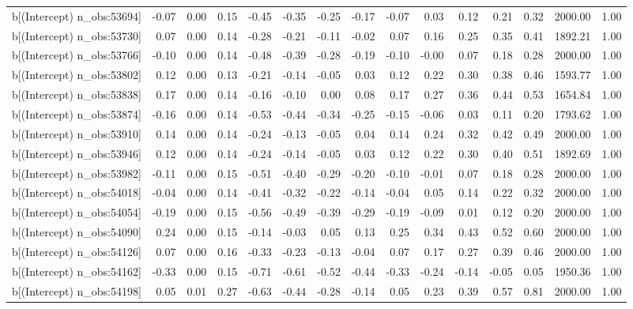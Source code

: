 \begin{table}[ht]
\begin{tabular}{rrrrrrrrrrrrrrr}
  b[(Intercept) n\_obs:53694] & -0.07 & 0.00 & 0.15 & -0.45 & -0.35 & -0.25 & -0.17 & -0.07 & 0.03 & 0.12 & 0.21 & 0.32 & 2000.00 & 1.00 \\ 
  b[(Intercept) n\_obs:53730] & 0.07 & 0.00 & 0.14 & -0.28 & -0.21 & -0.11 & -0.02 & 0.07 & 0.16 & 0.25 & 0.35 & 0.41 & 1892.21 & 1.00 \\ 
  b[(Intercept) n\_obs:53766] & -0.10 & 0.00 & 0.14 & -0.48 & -0.39 & -0.28 & -0.19 & -0.10 & -0.00 & 0.07 & 0.18 & 0.28 & 2000.00 & 1.00 \\ 
  b[(Intercept) n\_obs:53802] & 0.12 & 0.00 & 0.13 & -0.21 & -0.14 & -0.05 & 0.03 & 0.12 & 0.22 & 0.30 & 0.38 & 0.46 & 1593.77 & 1.00 \\ 
  b[(Intercept) n\_obs:53838] & 0.17 & 0.00 & 0.14 & -0.16 & -0.10 & 0.00 & 0.08 & 0.17 & 0.27 & 0.36 & 0.44 & 0.53 & 1654.84 & 1.00 \\ 
  b[(Intercept) n\_obs:53874] & -0.16 & 0.00 & 0.14 & -0.53 & -0.44 & -0.34 & -0.25 & -0.15 & -0.06 & 0.03 & 0.11 & 0.20 & 1793.62 & 1.00 \\ 
  b[(Intercept) n\_obs:53910] & 0.14 & 0.00 & 0.14 & -0.24 & -0.13 & -0.05 & 0.04 & 0.14 & 0.24 & 0.32 & 0.42 & 0.49 & 2000.00 & 1.00 \\ 
  b[(Intercept) n\_obs:53946] & 0.12 & 0.00 & 0.14 & -0.24 & -0.14 & -0.05 & 0.03 & 0.12 & 0.22 & 0.30 & 0.40 & 0.51 & 1892.69 & 1.00 \\ 
  b[(Intercept) n\_obs:53982] & -0.11 & 0.00 & 0.15 & -0.51 & -0.40 & -0.29 & -0.20 & -0.10 & -0.01 & 0.07 & 0.18 & 0.28 & 2000.00 & 1.00 \\ 
  b[(Intercept) n\_obs:54018] & -0.04 & 0.00 & 0.14 & -0.41 & -0.32 & -0.22 & -0.14 & -0.04 & 0.05 & 0.14 & 0.22 & 0.32 & 2000.00 & 1.00 \\ 
  b[(Intercept) n\_obs:54054] & -0.19 & 0.00 & 0.15 & -0.56 & -0.49 & -0.39 & -0.29 & -0.19 & -0.09 & 0.01 & 0.12 & 0.20 & 2000.00 & 1.00 \\ 
  b[(Intercept) n\_obs:54090] & 0.24 & 0.00 & 0.15 & -0.14 & -0.03 & 0.05 & 0.13 & 0.25 & 0.34 & 0.43 & 0.52 & 0.60 & 2000.00 & 1.00 \\ 
  b[(Intercept) n\_obs:54126] & 0.07 & 0.00 & 0.16 & -0.33 & -0.23 & -0.13 & -0.04 & 0.07 & 0.17 & 0.27 & 0.39 & 0.46 & 2000.00 & 1.00 \\ 
  b[(Intercept) n\_obs:54162] & -0.33 & 0.00 & 0.15 & -0.71 & -0.61 & -0.52 & -0.44 & -0.33 & -0.24 & -0.14 & -0.05 & 0.05 & 1950.36 & 1.00 \\ 
  b[(Intercept) n\_obs:54198] & 0.05 & 0.01 & 0.27 & -0.63 & -0.44 & -0.28 & -0.14 & 0.05 & 0.23 & 0.39 & 0.57 & 0.81 & 2000.00 & 1.00 \\ 

\end{tabular}
\end{table}
